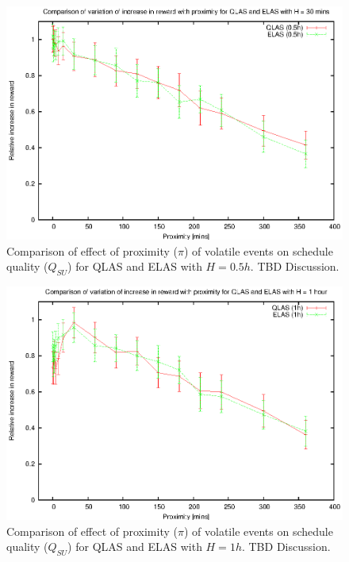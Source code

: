 
\begin{figure}[htbp]
\begin{center}
    \includegraphics[scale=1.0, angle=0]{figures/evplot_05.eps}
\end{center}
\caption[Comparison of effect of proximity ($\pi$) of volatile events on schedule quality ($Q_{SU}$) for QLAS and ELAS ($H = 0.5h$).]
{Comparison of effect of proximity ($\pi$) of volatile events on schedule quality ($Q_{SU}$) for QLAS and ELAS with $H = 0.5h$. TBD Discussion.}
\label{fig:vol_qe05_pi}
\end{figure}

\begin{figure}[htbp]
\begin{center}
    \includegraphics[scale=1.0, angle=0]{figures/evplot_1.eps}
\end{center}
\caption[Comparison of effect of proximity ($\pi$) of volatile events on schedule quality ($Q_{SU}$) for QLAS and ELAS ($H = 1h$).]
{Comparison of effect of proximity ($\pi$) of volatile events on schedule quality ($Q_{SU}$) for QLAS and ELAS with $H = 1h$. TBD Discussion.}
\label{fig:vol_qe1_pi}
\end{figure}

